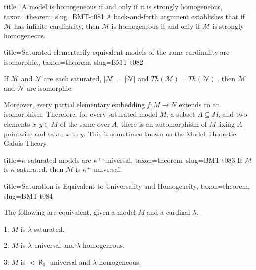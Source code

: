 \documentclass[a4paper]{article}
\begin{document}
\begin{tree}{title={A model is homogeneous if and only if it is strongly homogeneous}, taxon={theorem}, slug={BMT-t081}}
A back-and-forth argument establishes that if \(\mathcal {M}\) has infinite cardinality, then \(\mathcal {M}\) is homogeneous
if and only if \(\mathcal {M}\) is strongly homogeneous.
\end{tree}

\begin{tree}{title={Saturated elementarily equivalent models of the same cardinality are isomorphic.}, taxon={theorem}, slug={BMT-t082}}

    If \(\mathcal {M}\) and \(\mathcal {N}\) are each saturated, \(| \mathcal {M}|=| \mathcal {N}|\) and \(Th( \mathcal {M})=Th( \mathcal {N})\)
, then \(\mathcal {M}\) and \(\mathcal {N}\) are isomorphic.
\par{
    Moreover, every partial elementary embedding \(f:M \to  N\) extends to an isomorphism. 
    Therefore, for every saturated model \(M\), a subset \(A \subseteq  M\), and two elements \(x,y \in  M\) of the same  over \(A\), there is an automorphism of \(M\) fixing \(A\) pointwise and takes \(x\) to \(y\).
    This is sometimes known as the Model-Theoretic Galois Theory.
}
\end{tree}

\begin{tree}{title={\(\kappa\)-saturated models are \(\kappa ^+\)-universal}, taxon={theorem}, slug={BMT-t083}}
If \(\mathcal {M}\) is \(\kappa\)-saturated, then \(\mathcal {M}\) is \(\kappa ^+\)-universal.
\end{tree}

\begin{tree}{title={Saturation is Equivalent to Universality and Homogeneity}, taxon={theorem}, slug={BMT-t084}}

    The following are equivalent, given a model \(M\) and a cardinal \(\lambda\).
\par{
    1: \(M\) is \(\lambda\)-saturated.
}\par{
    2: \(M\) is \(\lambda\)-universal and \(\lambda\)-homogeneous.
}\par{
    3: \(M\) is \(< \aleph _0\)-universal and \(\lambda\)-homogeneous.
}
\end{tree}

\printbibliography
\end{document}
